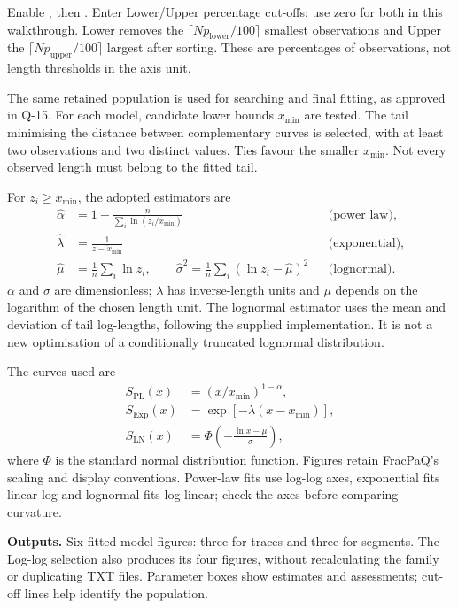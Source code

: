 \label{sec:mle}
Enable , then . Enter Lower/Upper percentage cut-offs; use zero for both in this walkthrough. Lower removes the \(\lceil Np_{\mathrm{lower}}/100\rceil\) smallest observations and Upper the \(\lceil Np_{\mathrm{upper}}/100\rceil\) largest after sorting. These are percentages of observations, not length thresholds in the axis unit.

The same retained population is used for searching and final fitting, as approved in Q-15. For each model, candidate lower bounds \(x_{\min}\) are tested. The tail minimising the distance between complementary curves is selected, with at least two observations and two distinct values. Ties favour the smaller \(x_{\min}\). Not every observed length must belong to the fitted tail.

For \(z_i\geq x_{\min}\), the adopted estimators are
\begin{align}
\widehat\alpha&=1+\frac{n}{\sum_i\ln(z_i/x_{\min})}
&&\text{(power law)},\\
\widehat\lambda&=\frac{1}{\overline{z-x_{\min}}}
&&\text{(exponential)},\\
\widehat\mu&=\frac1n\sum_i\ln z_i,\qquad
\widehat\sigma^2=\frac1n\sum_i(\ln z_i-\widehat\mu)^2
&&\text{(lognormal)}.
\end{align}
\(\alpha\) and \(\sigma\) are dimensionless; \(\lambda\) has inverse-length units and \(\mu\) depends on the logarithm of the chosen length unit. The lognormal estimator uses the mean and deviation of tail log-lengths, following the supplied implementation. It is not a new optimisation of a conditionally truncated lognormal distribution.

The curves used are
\begin{align}
S_{\mathrm{PL}}(x)&=(x/x_{\min})^{1-\alpha},\\
S_{\mathrm{Exp}}(x)&=\exp[-\lambda(x-x_{\min})],\\
S_{\mathrm{LN}}(x)&=\Phi\!\left(-\frac{\ln x-\mu}{\sigma}\right),
\end{align}
where \(\Phi\) is the standard normal distribution function. Figures retain FracPaQ's scaling and display conventions. Power-law fits use log-log axes, exponential fits linear-log and lognormal fits log-linear; check the axes before comparing curvature.

\textbf{Outputs.} Six fitted-model figures: three for traces and three for segments. The Log-log selection also produces its four figures, without recalculating the family or duplicating TXT files. Parameter boxes show estimates and assessments; cut-off lines help identify the population.


